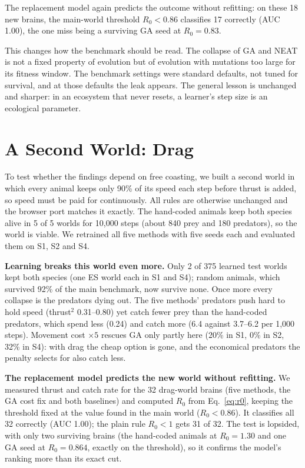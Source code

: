 \documentclass[conference]{IEEEtran}
\begin{document}
The replacement model again predicts the outcome without refitting: on these 18 new brains, the main-world threshold $R_0<0.86$ classifies 17 correctly (AUC 1.00), the one miss being a surviving GA seed at $R_0=0.83$.

This changes how the benchmark should be read. The collapse of GA and NEAT is not a fixed property of evolution but of evolution with mutations too large for its fitness window. The benchmark settings were standard defaults, not tuned for survival, and at those defaults the leak appears. The general lesson is unchanged and sharper: in an ecosystem that never resets, a learner's step size is an ecological parameter.

\section{A Second World: Drag}
\label{sec:drag}
To test whether the findings depend on free coasting, we built a second world in which every animal keeps only 90\% of its speed each step before thrust is added, so speed must be paid for continuously. All rules are otherwise unchanged and the browser port matches it exactly. The hand-coded animals keep both species alive in 5 of 5 worlds for 10,000 steps (about 840 prey and 180 predators), so the world is viable. We retrained all five methods with five seeds each and evaluated them on S1, S2 and S4.

\textbf{Learning breaks this world even more.} Only 2 of 375 learned test worlds kept both species (one ES world each in S1 and S4); random animals, which survived 92\% of the main benchmark, now survive none. Once more every collapse is the predators dying out. The five methods' predators push hard to hold speed (thrust$^2$ 0.31--0.80) yet catch fewer prey than the hand-coded predators, which spend less (0.24) and catch more (6.4 against 3.7--6.2 per 1,000 steps). Movement cost $\times5$ rescues GA only partly here (20\% in S1, 0\% in S2, 32\% in S4): with drag the cheap option is gone, and the economical predators the penalty selects for also catch less.

\textbf{The replacement model predicts the new world without refitting.} We measured thrust and catch rate for the 32 drag-world brains (five methods, the GA cost fix and both baselines) and computed $R_0$ from Eq.~\ref{eq:r0}, keeping the threshold fixed at the value found in the main world ($R_0<0.86$). It classifies all 32 correctly (AUC 1.00); the plain rule $R_0<1$ gets 31 of 32. The test is lopsided, with only two surviving brains (the hand-coded animals at $R_0=1.30$ and one GA seed at $R_0=0.864$, exactly on the threshold), so it confirms the model's ranking more than its exact cut.
\end{document}
